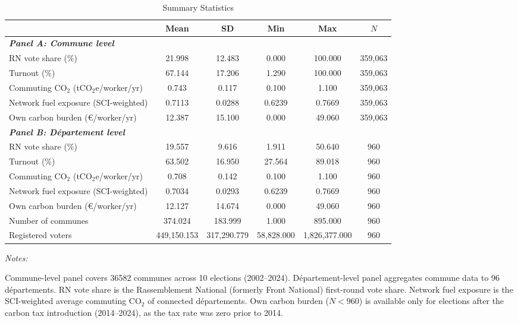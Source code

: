 \begin{table}[!h]
\centering
\caption{Summary Statistics}
\centering
\fontsize{10}{12}\selectfont
\begin{threeparttable}
\begin{tabular}[t]{lccccc}
\toprule
 & Mean & SD & Min & Max & $N$\\
\midrule
\textbf{\textit{Panel A: Commune level}} & \textbf{} & \textbf{} & \textbf{} & \textbf{} & \textbf{}\\
RN vote share (\%) & 21.998 & 12.483 & 0.000 & 100.000 & 359,063\\
Turnout (\%) & 67.144 & 17.206 & 1.290 & 100.000 & 359,063\\
Commuting CO$_2$ (tCO$_2$e/worker/yr) & 0.743 & 0.117 & 0.100 & 1.100 & 359,063\\
Network fuel exposure (SCI-weighted) & 0.7113 & 0.0288 & 0.6239 & 0.7669 & 359,063\\
Own carbon burden (\euro/worker/yr) & 12.387 & 15.100 & 0.000 & 49.060 & 359,063\\
\textbf{\textit{Panel B: D\'{e}partement level}} & \textbf{} & \textbf{} & \textbf{} & \textbf{} & \textbf{}\\
RN vote share (\%) & 19.557 & 9.616 & 1.911 & 50.640 & 960\\
Turnout (\%) & 63.502 & 16.950 & 27.564 & 89.018 & 960\\
Commuting CO$_2$ (tCO$_2$e/worker/yr) & 0.708 & 0.142 & 0.100 & 1.100 & 960\\
Network fuel exposure (SCI-weighted) & 0.7034 & 0.0293 & 0.6239 & 0.7669 & 960\\
Own carbon burden (\euro/worker/yr) & 12.127 & 14.674 & 0.000 & 49.060 & 960\\
Number of communes & 374.024 & 183.999 & 1.000 & 895.000 & 960\\
Registered voters & 449,150.153 & 317,290.779 & 58,828.000 & 1,826,377.000 & 960\\
\bottomrule
\end{tabular}
\begin{tablenotes}
\item \textit{Notes:} 
\item Commune-level panel covers 36582 communes across 10 elections (2002--2024). D\'{e}partement-level panel aggregates commune data to 96 d\'{e}partements. RN vote share is the Rassemblement National (formerly Front National) first-round vote share. Network fuel exposure is the SCI-weighted average commuting CO$_2$ of connected d\'{e}partements. Own carbon burden ($N < 960$) is available only for elections after the carbon tax introduction (2014--2024), as the tax rate was zero prior to 2014.
\end{tablenotes}
\end{threeparttable}
\end{table}
